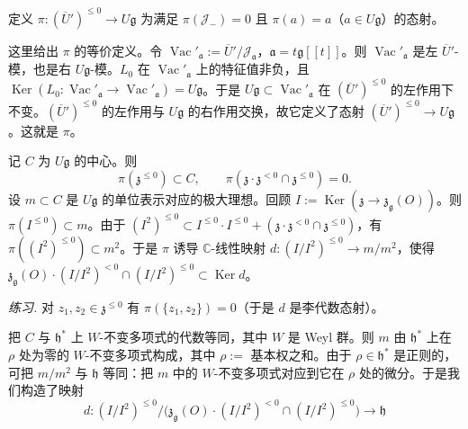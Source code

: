定义 $\pi: (\overline{U}')^{\le 0} \to U\mathfrak{g}$ 为满足 $\pi(\mathcal{J}_{-}) = 0$ 且 $\pi(a) = a$（$a \in U\mathfrak{g}$）的态射。

这里给出 $\pi$ 的等价定义。令 $\operatorname{Vac}'_{\mathfrak{a}} := \overline{U}'/\mathcal{J}_{\mathfrak{a}}$，$\mathfrak{a} = t\mathfrak{g}[[t]]$。则 $\operatorname{Vac}'_{\mathfrak{a}}$ 是左 $\overline{U}'$-模，也是右 $U\mathfrak{g}$-模。$L_{0}$ 在 $\operatorname{Vac}'_{\mathfrak{a}}$ 上的特征值非负，且 $\operatorname{Ker}(L_{0}: \operatorname{Vac}'_{\mathfrak{a}} \to \operatorname{Vac}'_{\mathfrak{a}}) = U\mathfrak{g}$。于是 $U\mathfrak{g} \subset \operatorname{Vac}'_{\mathfrak{a}}$ 在 $(\overline{U}')^{\le 0}$ 的左作用下不变。$(\overline{U}')^{\le 0}$ 的左作用与 $U\mathfrak{g}$ 的右作用交换，故它定义了态射 $(\overline{U}')^{\le 0} \to U\mathfrak{g}$。这就是 $\pi$。

 记 $C$ 为 $U\mathfrak{g}$ 的中心。则
\[
  \pi(\mathfrak{z}^{\le 0}) \subset C, \qquad \pi(\mathfrak{z}\cdot\mathfrak{z}^{<0} \cap \mathfrak{z}^{\le 0}) = 0.
\]
设 $m \subset C$ 是 $U\mathfrak{g}$ 的单位表示对应的极大理想。回顾 $I := \operatorname{Ker}(\mathfrak{z} \to \mathfrak{z}_{\mathfrak{g}}(O))$。则 $\pi(I^{\le 0}) \subset m$。由于 $(I^{2})^{\le 0} \subset I^{\le 0}\cdot I^{\le 0} + (\mathfrak{z}\cdot\mathfrak{z}^{<0} \cap \mathfrak{z}^{\le 0})$，有 $\pi((I^{2})^{\le 0}) \subset m^{2}$。于是 $\pi$ 诱导 $\mathbb{C}$-线性映射 $d: (I/I^{2})^{\le 0} \to m/m^{2}$，使得 $\mathfrak{z}_{\mathfrak{g}}(O)\cdot(I/I^{2})^{<0} \cap (I/I^{2})^{\le 0} \subset \operatorname{Ker} d$。


\emph{练习.} 对 $z_{1}, z_{2} \in \mathfrak{z}^{\le 0}$ 有 $\pi(\{z_{1}, z_{2}\}) = 0$（于是 $d$ 是李代数态射）。

 把 $C$ 与 $\mathfrak{h}^{*}$ 上 $W$-不变多项式的代数等同，其中 $W$ 是 Weyl 群。则 $m$ 由 $\mathfrak{h}^{*}$ 上在 $\rho$ 处为零的 $W$-不变多项式构成，其中 $\rho :=$ 基本权之和。由于 $\rho \in \mathfrak{h}^{*}$ 是正则的，可把 $m/m^{2}$ 与 $\mathfrak{h}$ 等同：把 $m$ 中的 $W$-不变多项式对应到它在 $\rho$ 处的微分。于是我们构造了映射
\begin{equation}\tag{83}
d: (I/I^{2})^{\le 0}/\bigl(\mathfrak{z}_{\mathfrak{g}}(O)\cdot(I/I^{2})^{<0} \cap (I/I^{2})^{\le 0}\bigr) \to \mathfrak{h}
\end{equation}

